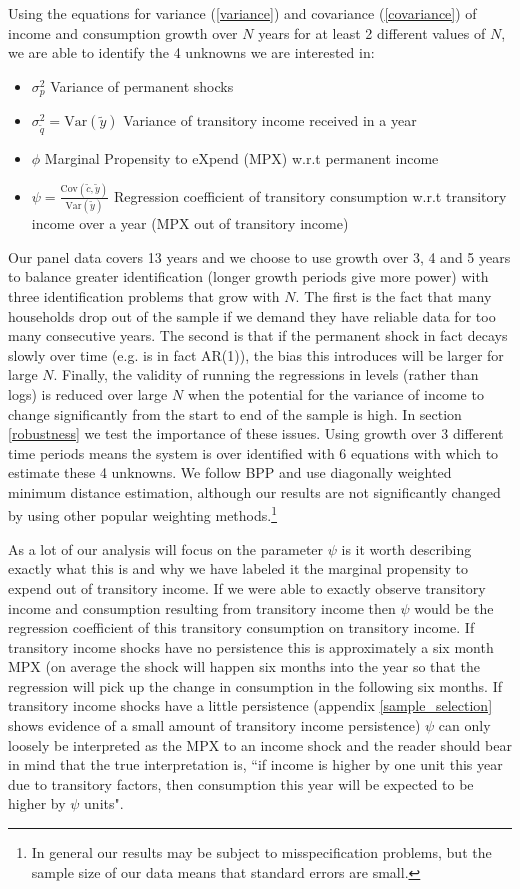 \documentclass[titlepage]{\econtex}\newcommand{\texname}{ConsumptionHeterogeneity}
\begin{document}
Using the equations for variance (\ref{variance}) and covariance (\ref{covariance}) of income and consumption growth over $N$ years for at least 2 different values of $N$, we are able to identify the 4 unknowns we are interested in:
	\begin{itemize}
	\item[1.] $\sigma^2_p$ Variance of permanent shocks
	\item[2.] $\sigma^2_{\tilde{q}} = \mathrm{Var}(\tilde{y})$ Variance of transitory income received in a year
	\item[3.] $\phi$ Marginal Propensity to eXpend (MPX) w.r.t permanent income
	\item[4.] $\psi = \frac{\mathrm{Cov}(\tilde{c},\tilde{y})}{\mathrm{Var}(\tilde{y})}$ Regression coefficient of transitory consumption w.r.t transitory income over a year (MPX out of transitory income)
\end{itemize}
Our panel data covers 13 years and we choose to use growth over 3, 4 and 5 years to balance greater identification (longer growth periods give more power) with three identification problems that grow with $N$. The first is the fact that many households drop out of the sample if we demand they have reliable data for too many consecutive years. The second is that if the permanent shock in fact decays slowly over time (e.g. is in fact AR(1)), the bias this introduces will be larger for large $N$. Finally, the validity of running the regressions in levels (rather than logs) is reduced over large $N$ when the potential for the variance of income to change significantly from the start to end of the sample is high. In section \ref{robustness} we test the importance of these issues. Using growth over 3 different time periods means the system is over identified with 6 equations with which to estimate these 4 unknowns. We follow BPP and use diagonally weighted minimum distance estimation, although our results are not significantly changed by using other popular weighting methods.\footnote{In general our results may be subject to misspecification problems, but the sample size of our data means that standard errors are small.}

As a lot of our analysis will focus on the parameter $\psi$ is it worth describing exactly what this is and why we have labeled it the marginal propensity to expend out of transitory income. If we were able to exactly observe transitory income and consumption resulting from transitory income then $\psi$ would be the regression coefficient of this transitory consumption on transitory income. If transitory income shocks have no persistence this is approximately a six month MPX (on average the shock will happen six months into the year so that the regression will pick up the change in consumption in the following six months. If transitory income shocks have a little persistence (appendix \ref{sample_selection} shows evidence of a small amount of transitory income persistence) $\psi$ can only loosely be interpreted as the MPX to an income shock and the reader should bear in mind that the true interpretation is, ``if income is higher by one unit this year due to transitory factors, then consumption this year will be expected to be higher by $\psi$ units".
\end{document}
